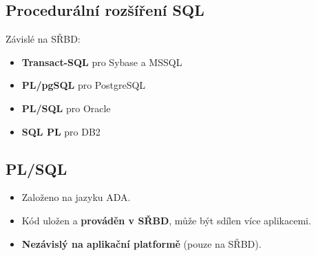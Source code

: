 \subsection{Procedurální rozšíření SQL}
Závislé na SŘBD:
\begin{itemize}
\item \textbf{Transact-SQL }pro Sybase a MSSQL
\item \textbf{PL/pgSQL} pro PostgreSQL
\item \textbf{PL/SQL} pro Oracle
\item \textbf{SQL PL} pro DB2
\end{itemize}

\subsection{PL/SQL}
\begin{itemize}
\item Založeno na jazyku ADA.
\item Kód uložen a \textbf{prováděn v SŘBD}, může být sdílen více aplikacemi.
\item \textbf{Nezávislý na aplikační platformě} (pouze na SŘBD).
\end{itemize}

